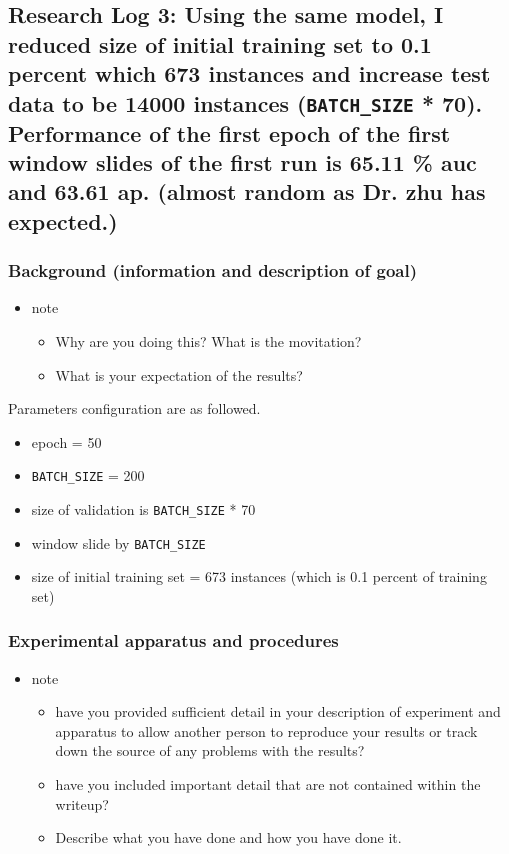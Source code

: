 \documentclass[11pt]{article}
\begin{document}
\subsection{Research Log 3: Using the same model, I reduced size of initial training set to 0.1 percent which 673 instances and increase test data to be 14000 instances (\texttt{BATCH\_SIZE} * 70). Performance of the first epoch of the first window slides of the first run is 65.11 \% auc and 63.61 ap. (almost random as Dr. zhu has expected.)}
\label{sec:orgb1897c8}
\subsubsection{Background (information and description of goal)}
\label{sec:org1b2415a}
\begin{itemize}
\item note
\begin{itemize}
\item Why are you doing this? What is the movitation?
\item What is your expectation of the results?
\end{itemize}
\end{itemize}

Parameters configuration are as followed.

\begin{itemize}
\item epoch = 50
\item \texttt{BATCH\_SIZE} = 200
\item size of validation is \texttt{BATCH\_SIZE} * 70
\item window slide by \texttt{BATCH\_SIZE}
\item size of initial training set = 673 instances (which is 0.1 percent of training set)
\end{itemize}
\subsubsection{Experimental apparatus and procedures}
\label{sec:orgde3b7f6}
\begin{itemize}
\item note
\begin{itemize}
\item have you provided sufficient detail in your description of experiment and apparatus to allow another person to reproduce your results or track down the source of any problems with the results?
\item have you included important detail that are not contained within the writeup?
\item Describe what you have done and how you have done it.
\end{itemize}
\end{itemize}
\end{document}
